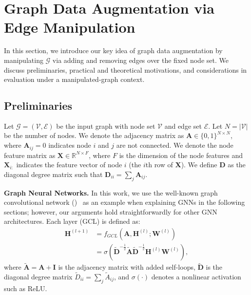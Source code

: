 \documentclass[letterpaper]{article} \usepackage{aaai21}  \usepackage{times}  \usepackage{helvet} \usepackage{courier}  \usepackage[hyphens]{url}  \usepackage{graphicx} \urlstyle{rm} \def\UrlFont{\rm}  \usepackage{natbib}  \usepackage{caption} \frenchspacing  \setlength{\pdfpagewidth}{8.5in}  \setlength{\pdfpageheight}{11in}
\begin{document}
 
\section{Graph Data Augmentation via\\ Edge Manipulation}
\label{sec:edgemanip}
In this section, we introduce our key idea of graph data augmentation by manipulating $\mathcal{G}$ via adding and removing edges over the fixed node set.  We discuss preliminaries, practical and theoretical motivations, and considerations in evaluation under a manipulated-graph context.

\subsection{Preliminaries}
Let $\mathcal{G} = (\mathcal{V}, \mathcal{E})$ be the input graph with node set $\mathcal{V}$ and edge set $\mathcal{E}$. Let $N = |\mathcal{V}|$ be the number of nodes. We denote the adjacency matrix as $\mathbf{A} \in \{0, 1\}^{N \times N}$, where $\mathbf{A}_{ij} = 0$ indicates node $i$ and $j$ are not connected. We denote the node feature matrix as $\mathbf{X} \in \mathbb{R}^{N \times F}$, where $F$ is the dimension of the node features and $\mathbf{X}_{i:}$ indicates the feature vector of node $i$ (the $i$th row of $\mathbf{X}$). We define $\mathbf{D}$ as the diagonal degree matrix such that $\mathbf{D}_{ii} = \sum_j \mathbf{A}_{ij}$.


\noindent \textbf{Graph Neural Networks.} In this work, we use the well-known graph convolutional network (\gcn)~\cite{kipf2016semi} as an example when explaining GNNs in the following sections; however, our arguments hold straightforwardly for other GNN architectures. Each \gcn layer (GCL) is defined as:
\begin{equation}
\begin{aligned}
    \mathbf{H}^{(l+1)} &= f_{GCL}(\mathbf{A}, \mathbf{H}^{(l)}; \mathbf{W}^{(l)}) \\
    &= \sigma(\tilde{\mathbf{D}}^{-\frac{1}{2}}\tilde{\mathbf{A}}\tilde{\mathbf{D}}^{-\frac{1}{2}}\mathbf{H}^{(l)}\mathbf{W}^{(l)}),
\end{aligned}
    \label{eq:gcn_layer}
\end{equation}
where $\tilde{\mathbf{A}} = \mathbf{A} + \mathbf{I}$ is the adjacency matrix with added self-loops,  $\tilde{\mathbf{D}}$ is the diagonal degree matrix  $\tilde{D}_{ii} = \sum_j \tilde{A}_{ij}$, and $\sigma(\cdot)$ denotes a nonlinear activation such as ReLU.
\end{document}
